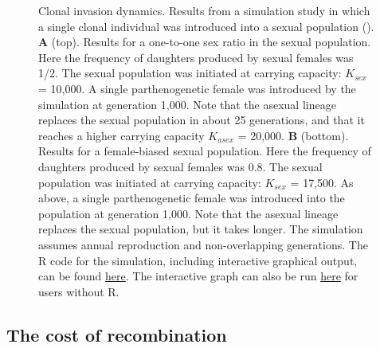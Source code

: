 \documentclass[
  letterpaper,
]{book}
\begin{document}
\begin{figure}
\caption[Clonal invasion dynamics]{\label{fig-1.2}Clonal invasion
dynamics. Results from a simulation study in which a single clonal
individual was introduced into a sexual population
(). \textbf{A} (top). Results for
a one-to-one sex ratio in the sexual population. Here the frequency of
daughters produced by sexual females was 1/2. The sexual population was
initiated at carrying capacity: \(K_{sex}\) = 10,000. A single
parthenogenetic female was introduced by the simulation at generation
1,000. Note that the asexual lineage replaces the sexual population in
about 25 generations, and that it reaches a higher carrying capacity
\(K_{asex}\) = 20,000. \textbf{B} (bottom). Results for a female-biased
sexual population. Here the frequency of daughters produced by sexual
females was 0.8. The sexual population was initiated at carrying
capacity: \(K_{sex}\) = 17,500. As above, a single parthenogenetic
female was introduced into the population at generation 1,000. Note that
the asexual lineage replaces the sexual population, but it takes longer.
The simulation assumes annual reproduction and non-overlapping
generations. The R code for the simulation, including interactive
graphical output, can be found
\href{https://raw.githubusercontent.com/IULibScholComm/through-the-looking-glass/main/sim\%20for\%20fig\%201.2(ZMD).R}{here}.
The interactive graph can also be run
\href{https://connect.posit.iu.edu/clonal-invasion-dynamics/}{here} for
users without R.}

\end{figure}%

\subsection{The cost of recombination}\label{the-cost-of-recombination}
\end{document}
